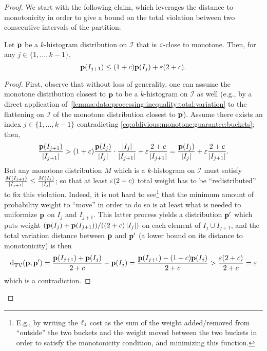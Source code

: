 \begin{proof}
    We start with the following claim, which leverages the distance to monotonicity in order to give a bound on the total violation between two consecutive intervals of the partition:
    \begin{claim}\label{claim:oblivious:monotone:guarantee:buckets}
      Let $\D$ be a $k$-histogram distribution on $\mathcal{I}$ that is $\eps$-close to monotone. Then, for any $j\in\{1,\dots,k-1\}$,
      \begin{equation}\label{eq:oblivious:monotone:guarantee:buckets}
	      \D(I_{j+1}) \leq (1+c)\D(I_{j})+\eps(2+c).
      \end{equation}
    \end{claim}
    \begin{proof}
    First, observe that without loss of generality, one can assume the monotone distribution closest to $\D$ to be a $k$-histogram on $\mathcal{I}$ as well (e.g., by a direct application of~\cref{lemma:data:processing:inequality:total:variation} to the flattening on $\mathcal{I}$ of the monotone distribution closest to $\D$). Assume there exists an index $j\in\{1,\dots,k-1\}$ contradicting \eqref{eq:oblivious:monotone:guarantee:buckets}; then,
    \[
	    \frac{\D(I_{j+1})}{\abs{I_{j+1}}} > (1+c)\frac{\D(I_{j})}{\abs{I_{j}}}\cdot\frac{\abs{I_{j}}}{\abs{I_{j+1}}} + \eps\frac{ 2+c }{ \abs{I_{j+1}}  } = \frac{\D(I_{j})}{\abs{I_{j}}} +   \eps\frac{ 2+c }{ \abs{I_{j+1}}  }.
    \]
    But any  monotone distribution $M$ which is a $k$-histogram on $\mathcal{I}$ must satisfy $\frac{M(I_{j+1})}{\abs{I_{j+1}}} \leq \frac{M(I_{j})}{\abs{I_{j}}}$; so that at least  $\eps(2+c)$ total {weight} has to be ``redistributed'' to fix this violation.     Indeed, it is not hard to see\footnote{E.g., by writing the $\lp[1]$ cost as the sum of the weight added/removed from ``outside'' the two buckets and the {weight} moved between the two buckets in order to satisfy the monotonicity condition, and minimizing this function.}
     that the minimum amount of probability weight to ``move'' in order to do so is at least what is needed to uniformize $\D$ on $I_j$ and $I_{j+1}$. 
    This latter process yields a distribution $\D^\prime$  
    which puts weight $(\D(I_j)+\D(I_{j+1}))/((2+c)\abs{I_j})$
    on each element of $I_j\cup I_{j+1}$, and the total variation distance between $\D$ and $\D^\prime$ (a lower bound on its distance to monotonicity) is then
    \[
	    \totalvardist{\D}{\D^\prime}=\frac{\D(I_{j+1})+\D(I_j)}{2+c}-\D(I_j) = \frac{\D(I_{j+1})-(1+c)\D(I_j)}{2+c} > \frac{\eps(2+c)}{2+c}=\eps
    \]
    which is a contradiction.

\end{proof}
\end{proof}
